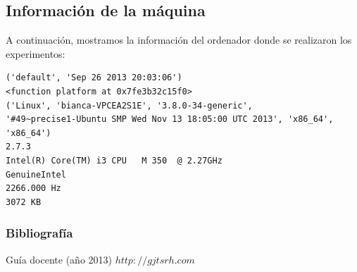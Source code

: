 \documentclass{beamer}
\begin{document}
\subsection{Información de la máquina}
\begin{frame}[fragile]
A continuación, mostramos la información del ordenador donde se realizaron los experimentos:

\begin{verbatim}
('default', 'Sep 26 2013 20:03:06')
<function platform at 0x7fe3b32c15f0>
('Linux', 'bianca-VPCEA2S1E', '3.8.0-34-generic',
'#49~precise1-Ubuntu SMP Wed Nov 13 18:05:00 UTC 2013', 'x86_64', 'x86_64')
2.7.3
Intel(R) Core(TM) i3 CPU   M 350  @ 2.27GHz
GenuineIntel
2266.000 Hz 
3072 KB
\end{verbatim}
\end{frame}

\begin{frame}
\frametitle{Bibliografía}
\begin{thebibliography}
\beamertemplatebookbibitems
{}
Guía docente (año 2013)
{\small $http://gjtsrh.com$}
\end{thebibliography}
\end{frame}
\end{document}
